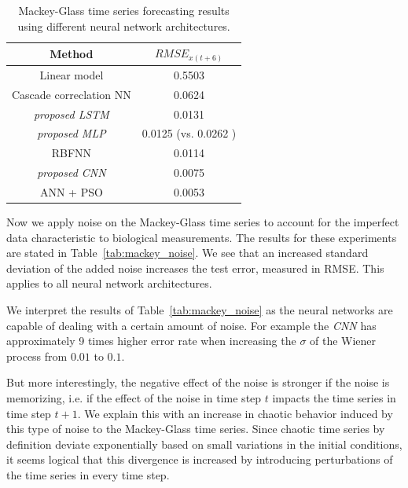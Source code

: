 \documentclass{article}
\begin{document}
\begin{table}
    \centering
    \begin{tabular}{c|c}
        Method                         & $RMSE_{x(t+6)}$                          \\
        \hline
        Linear model                   & 0.5503                                   \\
        Cascade correclation NN        & 0.0624                                   \\
        \textit{proposed LSTM}         & 0.0131                                   \\
        \textit{proposed MLP}          & 0.0125 (vs. 0.0262 \cite{caraballo2016}) \\
        RBFNN                          & 0.0114                                   \\
        \textit{proposed CNN}          & 0.0075                                   \\
        ANN + PSO \cite{caraballo2016} & 0.0053                                   \\
    \end{tabular}
    \caption{Mackey-Glass time series forecasting results using different neural
        network architectures.}
    \label{tab:mackey_results}
\end{table}

Now we apply noise on the Mackey-Glass time series to account for the imperfect
data characteristic to biological measurements. The results for these
experiments are stated in Table~\ref{tab:mackey_noise}. We see that an increased
standard deviation of the added noise increases the test error, measured in
RMSE. This applies to all neural network architectures.

We interpret the results of Table~\ref{tab:mackey_noise}
as the neural networks are capable of dealing with a certain
amount of noise. For example the \emph{CNN} has
approximately 9 times higher error rate when increasing the $\sigma$ of the
Wiener process from $0.01$ to $0.1$.

But more interestingly,
the negative effect of the noise is stronger if the noise is memorizing, i.e. if
the effect of the noise in time step $t$ impacts the time series in time step
$t + 1$. We explain this with an increase in chaotic behavior induced by this
type of noise to the Mackey-Glass time series. Since chaotic time series by
definition deviate exponentially based on small variations in the initial
conditions, it seems logical that this divergence is increased by introducing
perturbations of the time series in every time step.
\end{document}
